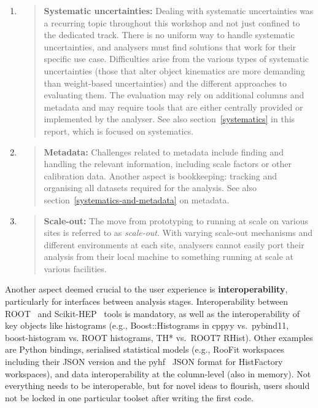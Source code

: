 \documentclass[a4paper,11pt]{article}
\begin{document}
\begin{enumerate}
\def\labelenumi{\arabic{enumi}.}
\item
  \begin{quote}
  \textbf{Systematic uncertainties:} Dealing with systematic
  uncertainties was a recurring topic throughout this workshop and not
  just confined to the dedicated track. There is no uniform way to
  handle systematic uncertainties, and analysers must find solutions
  that work for their specific use case. Difficulties arise from the
  various types of systematic uncertainties (those that alter object
  kinematics are more demanding than weight-based uncertainties) and the
  different approaches to evaluating them. The evaluation may rely on
  additional columns and metadata and may require tools that are either
  centrally provided or implemented by the analyser. See also
  section~\ref{systematics} in this report, which is focused
  on systematics.
  \end{quote}
\item
  \begin{quote}
  \textbf{Metadata:} Challenges related to metadata include finding and
  handling the relevant information, including scale factors or other
  calibration data. Another aspect is bookkeeping: tracking and
  organising all datasets required for the analysis. See also section~\ref{systematics-and-metadata} on metadata.
  \end{quote}
\item
  \begin{quote}
  \textbf{Scale-out:} The move from prototyping to running at scale on
  various sites is referred to as \emph{scale-out}. With varying
  scale-out mechanisms and different environments at each site,
  analysers cannot easily port their analysis from their local machine
  to something running at scale at various facilities.
  \end{quote}
\end{enumerate}

Another aspect deemed crucial to the user experience is
\textbf{interoperability}, particularly for interfaces between analysis
stages. Interoperability between ROOT~\cite{rene_brun_2019_3895860}
and Scikit-HEP~\cite{scikit-hep} tools is
mandatory, as well as the interoperability of key objects like
histograms (e.g., Boost::Histograms in cppyy vs.~pybind11,
boost-histogram vs. ROOT histograms, TH* vs.~ROOT7 RHist). Other
examples are Python bindings, serialised statistical models (e.g., RooFit
workspaces including their JSON version and the
pyhf~\cite{pyhf,pyhf_joss} JSON format for
HistFactory workspaces), and data interoperability at the column-level
(also in memory). Not everything needs to be interoperable, but for
novel ideas to flourish, users should not be locked in one particular
toolset after writing the first code.
\end{document}
